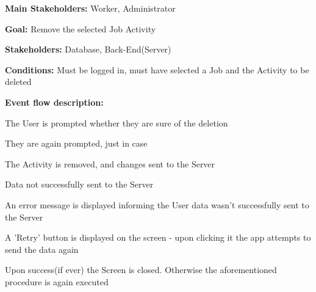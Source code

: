 			\noindent {}
			\begin{packed_item}
				\item \textbf{Main Stakeholders:} Worker, Administrator
				\item \textbf{Goal:} Remove the selected Job Activity
				\item \textbf{Stakeholders: } Database, Back-End(Server)
				\item \textbf{Conditions: } Must be logged in, must have selected a Job and the Activity to be deleted
				\item \textbf{Event flow description: }
				\begin{packed_enum}
					\item The User is prompted whether they are sure of the deletion
					\item They are again prompted, just in case
					\item The Activity is removed, and changes sent to the Server
				\end{packed_enum}
				
				\begin{packed_item}
					\item[3.a] Data not successfully sent to the Server
					\item[] \begin{packed_enum}
						\item An error message is displayed informing the User data wasn't successfully sent to the Server
						\item A 'Retry' button is displayed on the screen - upon clicking it the app attempts to send the data again
						\item Upon success(if ever) the Screen is closed. Otherwise the aforementioned procedure is again executed
					\end{packed_enum}
				\end{packed_item}
			\end{packed_item}
			
